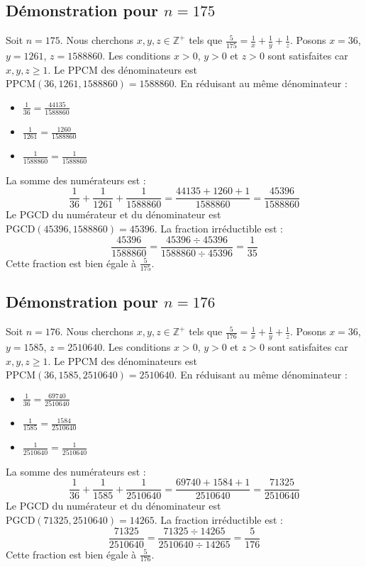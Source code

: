 \documentclass[11pt,a4paper]{article}
\begin{document}
\subsection{Démonstration pour $n = 175$}
Soit $n = 175$. Nous cherchons $x, y, z \in \mathbb{Z}^{+}$ tels que $\frac{5}{175} = \frac{1}{x} + \frac{1}{y} + \frac{1}{z}$.
Posons $x = 36$, $y = 1261$, $z = 1588860$.
Les conditions $x > 0$, $y > 0$ et $z > 0$ sont satisfaites car $x, y, z \geq 1$.
Le PPCM des dénominateurs est $\text{PPCM}(36, 1261, 1588860) = 1588860$.
En réduisant au même dénominateur :
\begin{itemize}
    \item $\frac{1}{36} = \frac{44135}{1588860}$
    \item $\frac{1}{1261} = \frac{1260}{1588860}$
    \item $\frac{1}{1588860} = \frac{1}{1588860}$
\end{itemize}
La somme des numérateurs est :
$$ \frac{1}{36} + \frac{1}{1261} + \frac{1}{1588860} = \frac{44135 + 1260 + 1}{1588860} = \frac{45396}{1588860} $$
Le PGCD du numérateur et du dénominateur est $\text{PGCD}(45396, 1588860) = 45396$.
La fraction irréductible est :
$$ \frac{45396}{1588860} = \frac{45396 \div 45396}{1588860 \div 45396} = \frac{1}{35} $$
Cette fraction est bien égale à $\frac{5}{175}$.

\subsection{Démonstration pour $n = 176$}
Soit $n = 176$. Nous cherchons $x, y, z \in \mathbb{Z}^{+}$ tels que $\frac{5}{176} = \frac{1}{x} + \frac{1}{y} + \frac{1}{z}$.
Posons $x = 36$, $y = 1585$, $z = 2510640$.
Les conditions $x > 0$, $y > 0$ et $z > 0$ sont satisfaites car $x, y, z \geq 1$.
Le PPCM des dénominateurs est $\text{PPCM}(36, 1585, 2510640) = 2510640$.
En réduisant au même dénominateur :
\begin{itemize}
    \item $\frac{1}{36} = \frac{69740}{2510640}$
    \item $\frac{1}{1585} = \frac{1584}{2510640}$
    \item $\frac{1}{2510640} = \frac{1}{2510640}$
\end{itemize}
La somme des numérateurs est :
$$ \frac{1}{36} + \frac{1}{1585} + \frac{1}{2510640} = \frac{69740 + 1584 + 1}{2510640} = \frac{71325}{2510640} $$
Le PGCD du numérateur et du dénominateur est $\text{PGCD}(71325, 2510640) = 14265$.
La fraction irréductible est :
$$ \frac{71325}{2510640} = \frac{71325 \div 14265}{2510640 \div 14265} = \frac{5}{176} $$
Cette fraction est bien égale à $\frac{5}{176}$.
\end{document}
